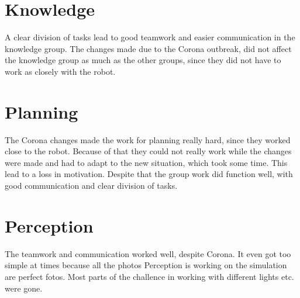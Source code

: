 \documentclass[main.tex]{subfiles}
\begin{document}
\section{Knowledge}

A clear division of tasks lead to good teamwork and easier communication in the knowledge group.
The changes made due to the Corona outbreak, did not affect the knowledge group as much as the other groups, since they did not have to work as closely with the robot.

\section{Planning}

The Corona changes made the work for planning really hard, since they worked close to the robot. Because of that they could not really work while the changes were made and had to adapt to the new situation, which took some time.
This lead to a loss in motivation. Despite that the group work did function well, with good communication and clear division of tasks.

\section{Perception}

The teamwork and communication worked well, despite Corona. It even got too simple at times because all the photos Perception is working on the simulation are perfect fotos. Most parts of the challence in working with different lights etc. were gone.


	
\end{document}
